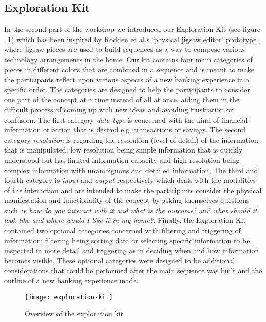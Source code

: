 \subsection{Exploration Kit}
In the second part of the workshop we introduced our Exploration Kit (see figure ~\ref{fig:exploration-kit}) which has been inspired by Rodden et al.s ‘physical jigsaw editor’ prototype \cite{rodden2004between}, where jigsaw pieces are used to build sequences as a way to compose various technology arrangements in the home. Our kit contains four main categories of pieces in different colors that are combined in a sequence and is meant to make the participants reflect upon various aspects of a new banking experience in a specific order. The categories are designed to help the participants to consider one part of the concept at a time instead of all at once, aiding them in the difficult process of coming up with new ideas and avoiding frustration or confusion. The first category \emph{data type} is concerned with the kind of financial information or action that is desired e.g. transactions or savings. The second category \emph{resolution} is regarding the resolution (level of detail) of the information that is manipulated; low resolution being simple information that is quickly understood but has limited information capacity and high resolution being complex information with unambiguous and detailed information. The third and fourth category is \emph{input} and \emph{output} respectively which deals with the modalities of the interaction and are intended to make the participants consider the physical manifestation and functionality of the concept by asking themselves questions such as \emph{how do you interact with it and what is the outcome?} and \emph{what should it look like and where would I like it in my home?}. Finally, the Exploration Kit contained two optional categories concerned with filtering and triggering of information; filtering being sorting data or selecting specific information to be inspected in more detail and triggering as in deciding when and how information becomes visible. These optional categories were designed to be additional considerations that could be performed after the main sequence was built and the outline of a new banking experience made.

\begin{figure}[!h]
	\centering
	\texttt{[image: exploration-kit]}
	\caption{Overview of the exploration kit}
	\label{fig:exploration-kit}
\end{figure}

